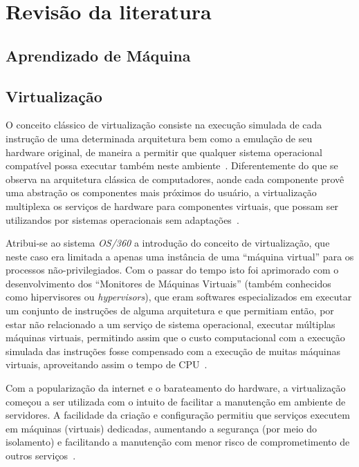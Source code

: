 %
%

\chapter{Revisão da literatura}

\section{Aprendizado de Máquina}\label{sec:aprendizado}



\section{Virtualização}\label{sec:virt}

O conceito clássico de virtualização consiste na execução simulada de cada
instrução de uma determinada arquitetura bem como a emulação de seu
hardware original, de maneira a permitir que qualquer sistema operacional
compatível possa executar também neste ambiente~\cite{goldberg1974survey}.
Diferentemente do que se observa na arquitetura clássica de computadores,
aonde cada componente provê uma abstração os componentes mais próximos do
usuário, a virtualização multiplexa os serviços de hardware para
componentes virtuais, que possam ser utilizandos por sistemas operacionais
sem adaptações~\cite{dutra2009a}.


Atribui-se ao sistema \emph{OS/360} a introdução do conceito de
virtualização, que neste caso era limitada a apenas uma instância de uma
``máquina virtual'' para os processos não-privilegiados. Com o passar do
tempo isto foi aprimorado com o desenvolvimento dos ``Monitores de
Máquinas Virtuais'' (também conhecidos como hipervisores ou
\emph{hypervisors}), que eram softwares especializados em executar um
conjunto de instruções de alguma arquitetura e que permitiam então, por
estar não relacionado a um serviço de sistema operacional, executar
múltiplas máquinas virtuais, permitindo assim que o custo computacional com
a execução simulada das instruções fosse compensado com a execução de
muitas máquinas virtuais, aproveitando assim o tempo de
CPU~\cite{goldberg1974survey}.

Com a popularização da internet e o barateamento do hardware, a
virtualização começou a ser utilizada com o intuito de facilitar a
manutenção em ambiente de servidores. A facilidade da criação e
configuração permitiu que serviços executem em máquinas (virtuais)
dedicadas, aumentando a segurança (por meio do isolamento) e facilitando a
manutenção com menor risco de comprometimento de outros
serviços~\cite{smith2005architecture}.


